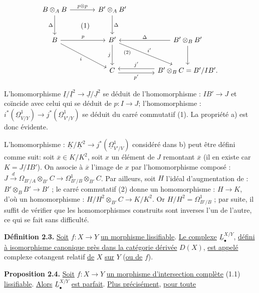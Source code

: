 
\[
\begin{tikzcd}[column sep=large,row sep=large]
B\otimes_A B \arrow[r,"p\otimes p"] \arrow[d,"\Delta"'] \arrow[dr,phantom,"(1)"] & B'\otimes_A B' \arrow[d,"\Delta"]\\
B \arrow[r,"p"] \arrow[dr,"i"'] & B' \arrow[d,"j"'] \arrow[dr,"i'","(2)"' near start] & B'\otimes_B B' \arrow[l,"\Delta"'] \arrow[d]\\
{} & C \arrow[r,shift right=.7ex,"p'"'] & B'\otimes_B C = B'/IB'. \arrow[l,shift right=.7ex,"j'"']
\end{tikzcd}
\]

L'homomorphisme $\underline{I}/\underline{I}^2\to\underline{J}/\underline{J}^2$ se déduit de l'homomorphisme : $IB'\to J$ et coïncide avec celui qui se déduit de $p:I\to J$; l'homomorphisme : $i^*(\underline{\Omega}^1_{V/Y})\longrightarrow j^*(\underline{\Omega}^1_{V'/Y})$ se déduit du carré commutatif (1). La propriété a) est donc évidente.

L'homomorphisme : $\underline{K}/\underline{K}^2\to j^*(\underline{\Omega}^1_{V'/V})$ considéré dans b) peut être défini comme suit: soit $\overline x\in K/K^2$, soit $x$ un élément de $J$ remontant $\overline x$ (il en existe car $K=J/IB'$). On associe à $\overline x$ l'image de $x$ par l'homomorphisme composé : $J\xrightarrow{d}\Omega_{B'/A}\otimes_{B'}C\longrightarrow\Omega^1_{B'/B}\otimes_{B'}C$. Par ailleurs, soit $H$ l'idéal d'augmentation de : $B'\otimes_B B'\longrightarrow B'$ ; le carré commutatif (2) donne un homomorphisme : $H\to K$, d'où un homomorphisme : $H/H^2\otimes_{B'}C\longrightarrow K/K^2$. Or $H/H^2=\Omega^1_{B'/B}$ ; par suite, il suffit de vérifier que les homomorphismes construits sont inverses l'un de l'autre, ce qui se fait sans difficulté.

\textbf{Définition 2.3.} \uline{Soit} $f:X\to Y$ \uline{un morphisme lissifiable}. \uline{Le complexe} $\underline{L}^{X/Y}_\bullet$, \uline{défini à isomorphisme canonique près dans la catégorie dérivée} $D(X)$, \uline{est appelé} complexe cotangent relatif \uline{de} $X$ \uline{sur} $Y$ (\uline{ou de} $f$).

\textbf{Proposition 2.4.} \uline{Soit} $f:X\to Y$ \uline{un morphisme d'intersection complète} (1.1) \uline{lissifiable}. \uline{Alors} $\underline{L}^{X/Y}_\bullet$ \uline{est parfait}. \uline{Plus précisément}, \uline{pour toute}
